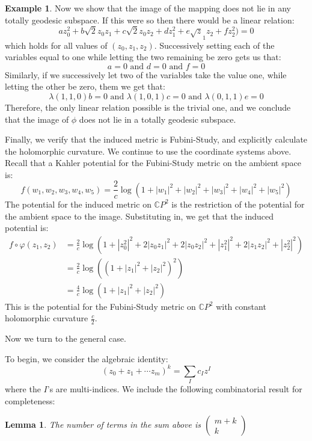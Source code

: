 \documentclass[11pt]{amsart}
\newtheorem{lem}[subsection]{Lemma}
\theoremstyle{definition}
\newtheorem{example}[subsection]{Example}
\def \CP{ \mathbb{C}P }
\begin{document}
\begin{example}
Now we show that the image of the mapping does not lie in any totally geodesic subspace.  If this were so then there would be a linear relation:
%
$$  a z_0^2 + b \sqrt{2} z_0 z_1 + c \sqrt{2} z_0 z_2 + d z_1^2 + e \sqrt z_1 z_2 + f z_2^2 ) = 0 $$
%
which holds for all values of $(z_0, z_1, z_2)$.  Successively setting each of the variables equal to one while letting the two remaining be zero gets us that:
%
$$ a = 0 \text{ and } d = 0 \text{ and } f = 0 $$
%
Similarly, if we successively let two of the variables take the value one, while letting the other be zero, them we get that:
%
$$ \lambda(1,1,0) b = 0 \text{ and } \lambda(1,0,1) c = 0 \text{ and } \lambda(0,1,1) e = 0 $$
%
Therefore, the only linear relation possible is the trivial one, and we conclude that the image of $\phi$ does not lie in a totally geodesic subspace.

Finally, we verify that the induced metric is Fubini-Study, and explicitly calculate the holomorphic curvature.  We continue to use the coordinate systems above.  Recall that a Kahler potential for the Fubini-Study metric on the ambient space is:
%
$$ f( w_1, w_2, w_3, w_4, w_5 ) = \frac{2}{c} \log ( 1 + |w_1|^2 + |w_2|^2 + |w_3|^2 + |w_4|^2 + |w_5|^2 ) $$
%
The potential for the induced metric on $\CP^2$ is the restriction of the potential for the ambient space to the image.  Substituting in, we get that the induced potential is:
%
\begin{align*}
f \circ \varphi ( z_1, z_2 ) &= \frac{2}{c} \log ( 1 + |z_0^2|^2 + 2|z_0 z_1|^2 + 2|z_0 z_2|^2 + |z_1^2|^2 + 2|z_1 z_2|^2 + |z_2^2|^2 ) \\
&= \frac{2}{c} \log( (1 + |z_1|^2 + |z_2|^2 )^2 ) \\
&= \frac{4}{c} \log( 1 + |z_1|^2 + |z_2|^2 )
\end{align*}
%
This is the potential for the Fubini-Study metric on $\CP^2$ with constant holomorphic curvature $\frac{c}{2}$.
%
\end{example}

Now we turn to the general case.

To begin, we consider the algebraic identity:
%
$$ (z_0 + z_1 + \cdots z_m )^k = \sum_I c_I z^I $$
%
where the $I$'s are multi-indices.  We include the following combinatorial result for completeness:
%
\begin{lem} The number of terms in the sum above is $\left( \begin{array}{c} m + k \\ k \end{array} \right)$
\end{lem}
\end{document}
